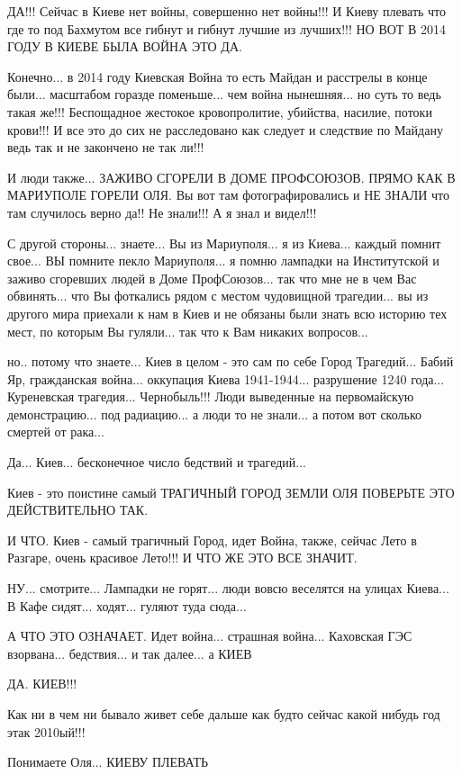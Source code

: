 ДА!!! Сейчас в Киеве нет войны, совершенно нет войны!!! И Киеву плевать что где то 
под Бахмутом все гибнут и гибнут лучшие из лучших!!! НО ВОТ В 2014 ГОДУ В КИЕВЕ БЫЛА ВОЙНА
ЭТО ДА.

Конечно... в 2014 году Киевская Война то есть Майдан и расстрелы в конце
были... масштабом горазде поменьше... чем война нынешняя... но суть то ведь
такая же!!! Беспощадное жестокое кровопролитие, убийства, насилие, потоки
крови!!! И все это до сих не расследовано как следует и следствие по Майдану
ведь так и не закончено не так ли!!!

И люди также... ЗАЖИВО СГОРЕЛИ В ДОМЕ ПРОФСОЮЗОВ. ПРЯМО КАК В МАРИУПОЛЕ ГОРЕЛИ ОЛЯ.
Вы вот там фотографировались и НЕ ЗНАЛИ что там случилось верно да!! Не знали!!!
А я знал и видел!!! 

С другой стороны... знаете... Вы из Мариуполя... я из Киева... каждый помнит свое...
ВЫ помните пекло Мариуполя... я помню лампадки на Институтской и заживо сгоревших людей в Доме 
ПрофСоюзов... так что мне не в чем Вас обвинять... что Вы фоткались рядом с местом чудовищной трагедии...
вы из другого мира приехали к нам в Киев и не обязаны были знать всю историю тех мест, по которым Вы гуляли...
так что к Вам никаких вопросов...

но.. потому что знаете... Киев в целом - это сам по себе Город Трагедий... Бабий Яр, гражданская война... оккупация Киева 1941-1944...
разрушение 1240 года... Куреневская трагедия... Чернобыль!!! Люди выведенные на первомайскую демонстрацию...
под радиацию... а люди то не знали... а потом вот сколько смертей от рака... 

Да... Киев... бесконечное число бедствий и трагедий... 

Киев - это поистине самый ТРАГИЧНЫЙ ГОРОД ЗЕМЛИ ОЛЯ ПОВЕРЬТЕ ЭТО ДЕЙСТВИТЕЛЬНО ТАК.

И ЧТО. Киев - самый трагичный Город, идет Война, также, сейчас Лето в Разгаре, очень красивое Лето!!!
И ЧТО ЖЕ ЭТО ВСЕ ЗНАЧИТ.

НУ... смотрите... Лампадки не горят... люди вовсю веселятся на улицах Киева... В Кафе сидят... ходят...
гуляют туда сюда... 

А ЧТО ЭТО ОЗНАЧАЕТ. Идет война... страшная война... Каховская ГЭС взорвана... бедствия...
и так далее... а КИЕВ

ДА. КИЕВ!!! 

Как ни в чем ни бывало живет себе дальше как будто сейчас какой нибудь год этак 2010ый!!!

Понимаете Оля... КИЕВУ ПЛЕВАТЬ

